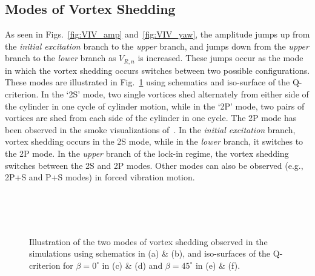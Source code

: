 \subsection{Modes of Vortex Shedding}
\label{sec:VIVmodes}
%
As seen in Figs.~\ref{fig:VIV_amp} and~\ref{fig:VIV_yaw}, the amplitude jumps
up from the {\em initial excitation} branch to the {\em upper} branch, and
jumps down from the {\em upper} branch to the {\em lower} branch as $V_{R,n}$
is increased. These jumps occur as the mode in which the vortex shedding occurs
switches between two possible configurations. These modes are illustrated in
Fig.~\ref{fig:VIV_Q} using schematics and iso-surface of the Q-criterion.
In the `2S' mode, two single vortices shed alternately from either
side of the cylinder in one cycle of cylinder motion, while in the `2P' mode,
two pairs of vortices are shed from each side of the cylinder in one cycle.
The 2P mode has been observed in the smoke visualizations of~\citet{brika1993vortex}.
In the {\em initial excitation} branch, vortex shedding occurs in the 2S mode,
while in the {\em lower} branch, it switches to the 2P mode. In the {\em
upper} branch of the lock-in regime, the vortex shedding switches between the
2S and 2P modes. Other modes can also be observed (e.g., 2P+S and P+S modes) in
forced vibration motion.
%
\begin{figure}[htb!]
   \qquad
   \\
%
   \qquad
   \\
%
   \qquad
   \\
    \caption{Illustration of the two modes of vortex shedding observed in the
    simulations using schematics in (a) \& (b), and iso-surfaces of the
    Q-criterion for $\beta=0^\circ$ in (c) \& (d) and $\beta=45^\circ$ in (e) \&
    (f).}
  \label{fig:VIV_Q}
\end{figure}
%
